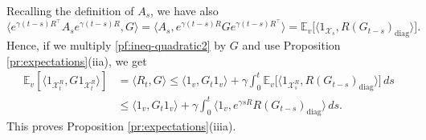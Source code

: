 \documentclass[11pt,reqno]{amsart}
\numberwithin{equation}{section}
\theoremstyle{definition}
\def\E{{\mathbb E}}
\def\X{{\mathcal X}}
\begin{document}
Recalling the definition of $A_s$, we have also
\begin{equation*}
\langle e^{\gamma (t-s)R^\top}A_s e^{\gamma (t-s)R},G\rangle = \langle A_s, e^{\gamma (t-s)R}Ge^{\gamma (t-s)R^\top} \rangle = \E_v\big[\langle 1_{\X_s}, R (G_{t-s})_{\mathrm{diag}}\rangle\big].
\end{equation*}
Hence, if we multiply \eqref{pf:ineq-quadratic2} by $G$ and use Proposition \ref{pr:expectations}(iia), we get
\begin{align*}
\E_v[\langle 1_{\X^{R}_t},G1_{\X^{R}_t}\rangle ] &= \langle R_t,G\rangle  \le \langle 1_v, G_t 1_v\rangle  + \gamma \int_0^t \E_v\big[\langle 1_{\X^{R}_s}, R (G_{t-s})_{\mathrm{diag}}\rangle\big] \,ds \\
	&\le \langle 1_v, G_t 1_v\rangle  + \gamma \int_0^t \langle 1_v, e^{\gamma sR} R (G_{t-s})_{\mathrm{diag}}\rangle  \,ds .
\end{align*}
This proves Proposition \ref{pr:expectations}(iiia).
\end{document}
